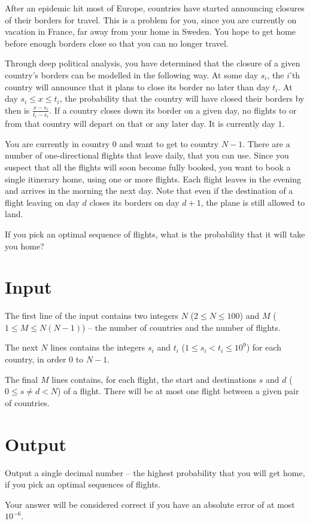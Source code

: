 After an epidemic hit most of Europe, countries have started announcing closures of their borders for travel.
This is a problem for you, since you are currently on vacation in France, far away from your home in Sweden.
You hope to get home before enough borders close so that you can no longer travel.

Through deep political analysis, you have determined that the closure of a given country's borders can be modelled in the following way.
At some day $s_i$, the $i$'th country will announce that it plans to close its border no later than day $t_i$.
At day $s_i \le x \le t_i$, the probability that the country will have closed their borders by then is $\frac{x - s_i}{t_i - s_i}$.
If a country closes down its border on a given day, no flights to or from that country will depart on that or any later day.
It is currently day $1$.

You are currently in country $0$ and want to get to country $N - 1$.
There are a number of one-directional flights that leave daily, that you can use.
Since you suspect that all the flights will soon become fully booked, you want to book a single itinerary home, using one or more flights.
Each flight leaves in the evening and arrives in the morning the next day.
Note that even if the destination of a flight leaving on day $d$ closes its borders on day $d + 1$, the plane is still allowed to land.

If you pick an optimal sequence of flights, what is the probability that it will take you home?

\section*{Input}
The first line of the input contains two integers $N$ ($2 \le N \le 100$) and $M$ ($1 \le M \le N(N-1)$)  -- the number of countries and the number of flights.

The next $N$ lines contains the integers $s_i$ and $t_i$ ($1 \le s_i < t_i \le 10^9$) for each country, in order $0$ to $N - 1$.

The final $M$ lines contains, for each flight, the start and destinations $s$ and $d$ ($0 \le s \neq d < N$) of a flight.
There will be at most one flight between a given pair of countries.

\section*{Output}
Output a single decimal number -- the highest probability that you will get home, if you pick an optimal sequences of flights.

Your answer will be considered correct if you have an absolute error of at most ${10}^{-6}$.
